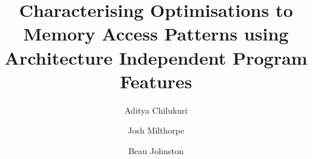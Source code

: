 \documentclass[review=false, sigchi]{acmart}
\title[Architecture Independent Memory Access Pattern Analysis]{Characterising Optimisations to Memory Access Patterns using Architecture Independent Program Features}
\author{Aditya Chilukuri}
\affiliation{%
	\institution{Australian National University}}
\author{Josh Milthorpe}
\affiliation{%
	\institution{Australian National University}}
\author{Beau Johnston}
\affiliation{%
	\institution{Australian National University}}
\begin{document}
	

\end{document}

